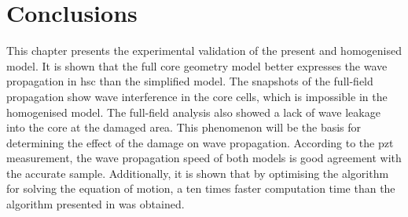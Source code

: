 \section{Conclusions}
\label{sec:conclusionsValid}

This chapter presents the experimental validation of the present and homogenised model.
It is shown that the full core geometry model better expresses the wave propagation in \ac{hsc} than the simplified model.
The snapshots of the full-field propagation show wave interference in the core cells, which is impossible in the homogenised model.
The full-field analysis also showed a lack of wave leakage into the core at the damaged area.
This phenomenon will be the basis for determining the effect of the damage on wave propagation.
According to the \ac{pzt} measurement, the wave propagation speed of both models is good agreement with the accurate sample.
Additionally, it is shown that by optimising the algorithm for solving the equation of motion, a ten times faster computation time than the algorithm presented in \cite{kudela2020parallel} was obtained.